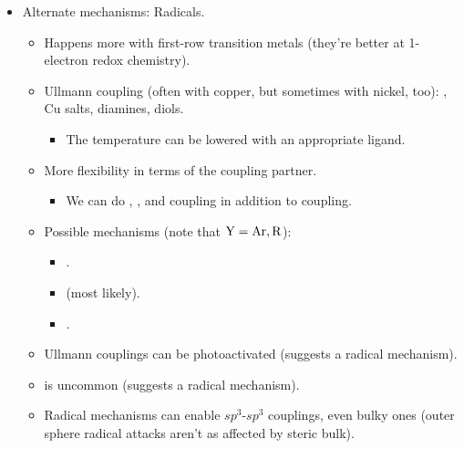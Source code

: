 \documentclass[../notes.tex]{subfiles}
\begin{document}
\begin{itemize}
\begin{itemize}
    \end{itemize}
    \item Alternate mechanisms: Radicals.
    \begin{itemize}
        \item Happens more with first-row transition metals (they're better at 1-electron redox chemistry).
        \item Ullmann coupling (often with copper, but sometimes with nickel, too): , Cu salts, diamines, diols.
        \begin{itemize}
            \item The temperature can be lowered with an appropriate ligand.
        \end{itemize}
        \item More flexibility in terms of the coupling partner.
        \begin{itemize}
            \item We can do , , and  coupling in addition to  coupling.
        \end{itemize}
        \item Possible mechanisms (note that $\ce{Y}=\ce{Ar},\ce{R}$):
        \begin{itemize}
            \item {}.
            \item {} (most likely).
            \item {}.
        \end{itemize}
        \item Ullmann couplings can be photoactivated (suggests a radical mechanism).
        \item {} is uncommon (suggests a radical mechanism).
        \item Radical mechanisms can enable $sp^3$-$sp^3$ couplings, even bulky ones (outer sphere radical attacks aren't as affected by steric bulk).
    \end{itemize}
\end{itemize}
\end{document}
